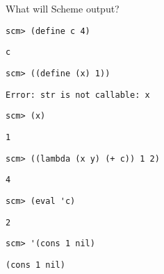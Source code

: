 \begin{blocksection}
\question What will Scheme output?
	
\begin{lstlisting}
scm> (define c 4)
\end{lstlisting}
\begin{solution}[0.25in]
\begin{lstlisting}
c
\end{lstlisting}
\end{solution}
	
\begin{lstlisting}
scm> ((define (x) 1))
\end{lstlisting}
\begin{solution}[0.25in]
\begin{lstlisting}
Error: str is not callable: x
\end{lstlisting}
\end{solution}
	
\begin{lstlisting}
scm> (x)
\end{lstlisting}
\begin{solution}[0.25in]
\begin{lstlisting}
1
\end{lstlisting}
\end{solution}
	
\begin{lstlisting}
scm> ((lambda (x y) (+ c)) 1 2)
\end{lstlisting}
\begin{solution}[0.25in]
\begin{lstlisting}
4
\end{lstlisting}
\end{solution}
	
\begin{lstlisting}
scm> (eval 'c)
\end{lstlisting}
\begin{solution}[0.25in]
\begin{lstlisting}
2
\end{lstlisting}
\end{solution}
	
\begin{lstlisting}
scm> '(cons 1 nil)
\end{lstlisting}
\begin{solution}[0.25in]
\begin{lstlisting}
(cons 1 nil)
\end{lstlisting}
\end{solution}
	

\end{blocksection}
